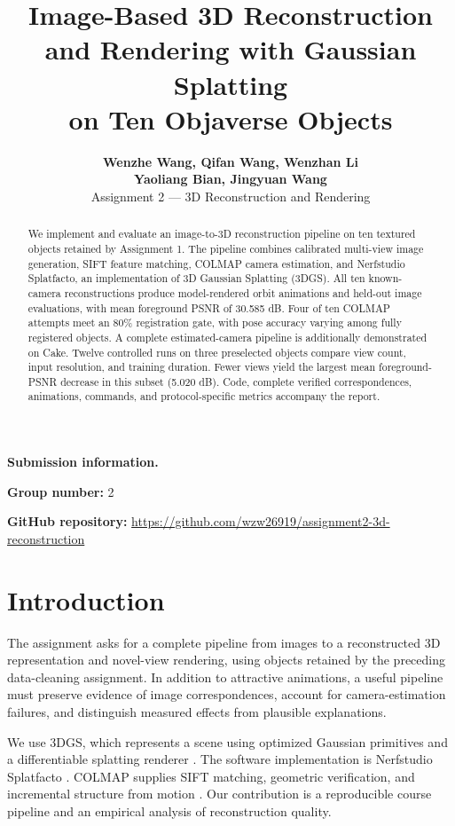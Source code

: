 \documentclass{article}
\title{Image-Based 3D Reconstruction\\and Rendering with Gaussian Splatting\\on Ten Objaverse Objects}
\author{\textbf{Wenzhe Wang, Qifan Wang, Wenzhan Li}\\\textbf{Yaoliang Bian, Jingyuan Wang}\\Assignment 2 --- 3D Reconstruction and Rendering}
\begin{document}
\maketitle
{}

\begin{abstract}
We implement and evaluate an image-to-3D reconstruction pipeline on ten textured objects retained by Assignment 1. The pipeline combines calibrated multi-view image generation, SIFT feature matching, COLMAP camera estimation, and Nerfstudio Splatfacto, an implementation of 3D Gaussian Splatting (3DGS). All ten known-camera reconstructions produce model-rendered orbit animations and held-out image evaluations, with mean foreground PSNR of 30.585 dB. Four of ten COLMAP attempts meet an 80\% registration gate, with pose accuracy varying among fully registered objects. A complete estimated-camera pipeline is additionally demonstrated on Cake. Twelve controlled runs on three preselected objects compare view count, input resolution, and training duration. Fewer views yield the largest mean foreground-PSNR decrease in this subset (5.020 dB). Code, complete verified correspondences, animations, commands, and protocol-specific metrics accompany the report.
\end{abstract}

\noindent\textbf{Submission information.}\par\smallskip
\noindent\textbf{Group number:} 2\par\smallskip
\noindent\textbf{GitHub repository:} {\url{https://github.com/wzw26919/assignment2-3d-reconstruction}}\par\smallskip

\section{Introduction}
The assignment asks for a complete pipeline from images to a reconstructed 3D representation and novel-view rendering, using objects retained by the preceding data-cleaning assignment. In addition to attractive animations, a useful pipeline must preserve evidence of image correspondences, account for camera-estimation failures, and distinguish measured effects from plausible explanations.

We use 3DGS, which represents a scene using optimized Gaussian primitives and a differentiable splatting renderer \citep{kerbl2023}. The software implementation is Nerfstudio Splatfacto \citep{nerfstudio}. COLMAP supplies SIFT matching, geometric verification, and incremental structure from motion \citep{colmap}. Our contribution is a reproducible course pipeline and an empirical analysis of reconstruction quality.
\end{document}
